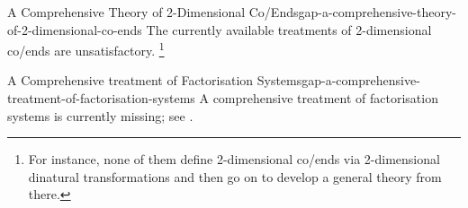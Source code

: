 \begin{gap}{A Comprehensive Theory of 2-Dimensional Co/Ends}{gap-a-comprehensive-theory-of-2-dimensional-co-ends}%
    The currently available treatments of 2-dimensional co/ends are unsatisfactory.%
    \footnote{%
        For instance, none of them define 2-dimensional co/ends via 2-dimensional dinatural transformations and then go on to develop a general theory from there.
        \par\vspace*{\TCBBoxCorrection}
    }%
\end{gap}
\begin{gap}{A Comprehensive treatment of Factorisation Systems}{gap-a-comprehensive-treatment-of-factorisation-systems}%
    A comprehensive treatment of factorisation systems is currently missing; see \cite{MO495003}.
\end{gap}
\begin{appendices}

\end{appendices}

